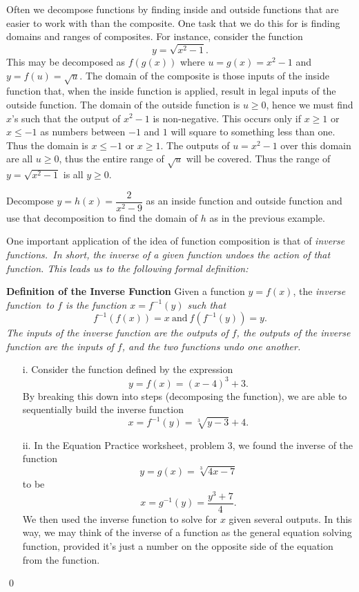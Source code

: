 \begin{eg} Often we decompose functions by finding inside and outside functions that are easier to work with than the composite. One task that we do this for is finding domains and ranges of composites. For instance, consider the function
\[
y = \sqrt{x^2-1}.
\]
This may be decomposed as $f(g(x))$ where $u = g(x) = x^2-1$ and $y=f(u) = \sqrt{u}$. The domain of the composite is those inputs of the inside function that, when the inside function is applied, result in legal inputs of the outside function. The domain of the outside function is $u\geq 0$, hence we must find $x$'s such that the output of $x^2-1$ is non-negative. This occurs only if $x\geq 1$ or $x\leq -1$ as numbers between $-1$ and $1$ will square to something less than one. Thus the domain is $x\leq -1$ or $x\geq 1$. The outputs of $u = x^2-1$ over this domain are all $u\geq 0$, thus the entire range of $\sqrt{u}$ will be covered. Thus the range of $y = \sqrt{x^2-1}$ is all $y\geq 0$.
\end{eg}
\par 

\begin{question} Decompose $y = h(x) = \dfrac{2}{x^2-9}$ as an inside function and outside function and use that decomposition to find the domain of $h$ as in the previous example.
\end{question}

\par 

One important application of the idea of function composition is that of \it{inverse functions.\ }\normalfont In short, the inverse of a given function undoes the action of that function. This leads us to the following formal definition:

\begin{tcolorbox}
{\bf Definition of the Inverse Function}
Given a function $y = f(x)$, the \it{inverse function\ }\normalfont to $f$ is the function $x = f^{-1}(y)$ such that
\[
f^{-1}(f(x)) = x\ \mbox{and}\ f(f^{-1}(y)) = y.
\]
The inputs of the inverse function are the outputs of $f$, the outputs of the inverse function are the inputs of $f$, and the two functions undo one another.
\end{tcolorbox}

\begin{eg}
\begin{enumerate} 
\item[i.] Consider the function defined by the expression
\[
y = f(x) = (x-4)^3 + 3.
\]
By breaking this down into steps (decomposing the function), we are able to sequentially build the inverse function
\[
x = f^{-1}(y) = \sqrt[3]{y-3} + 4.
\]
\item[ii.] In the Equation Practice worksheet, problem 3, we found the inverse of the function
\[
y =g(x) = \sqrt[3]{4x-7}
\]
to be
\[
x = g^{-1}(y) = \frac{y^3+7}{4}.
\]
We then used the inverse function to solve for $x$ given several outputs. In this way, we may think of the inverse of a function as the general equation solving function, provided it's just a number on the opposite side of the equation from the function.
\end{enumerate}\qed \end{eg}

